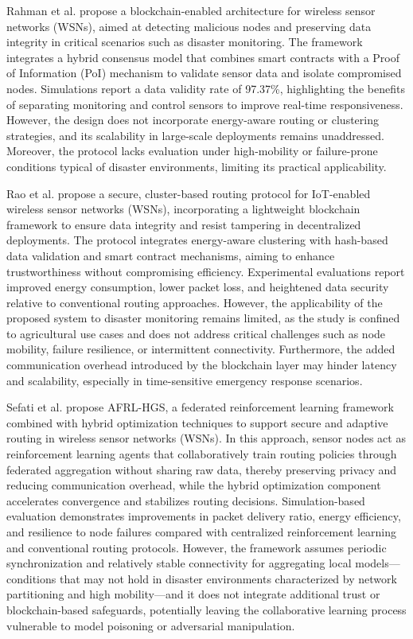 \documentclass[journal]{IEEEtran}
\begin{document}
Rahman et al. \cite{rahman_distributed_2025} propose a blockchain-enabled architecture for wireless sensor networks (WSNs), aimed at detecting malicious nodes and preserving data integrity in critical scenarios such as disaster monitoring. The framework integrates a hybrid consensus model that combines smart contracts with a Proof of Information (PoI) mechanism to validate sensor data and isolate compromised nodes. Simulations report a data validity rate of 97.37\%, highlighting the benefits of separating monitoring and control sensors to improve real-time responsiveness. However, the design does not incorporate energy-aware routing or clustering strategies, and its scalability in large-scale deployments remains unaddressed. Moreover, the protocol lacks evaluation under high-mobility or failure-prone conditions typical of disaster environments, limiting its practical applicability.

Rao et al. \cite{rao_optimized_2024} propose a secure, cluster-based routing protocol for IoT-enabled wireless sensor networks (WSNs), incorporating a lightweight blockchain framework to ensure data integrity and resist tampering in decentralized deployments. The protocol integrates energy-aware clustering with hash-based data validation and smart contract mechanisms, aiming to enhance trustworthiness without compromising efficiency. Experimental evaluations report improved energy consumption, lower packet loss, and heightened data security relative to conventional routing approaches. However, the applicability of the proposed system to disaster monitoring remains limited, as the study is confined to agricultural use cases and does not address critical challenges such as node mobility, failure resilience, or intermittent connectivity. Furthermore, the added communication overhead introduced by the blockchain layer may hinder latency and scalability, especially in time-sensitive emergency response scenarios.

Sefati et al. \cite{sefati_federated_2025} propose AFRL-HGS, a federated reinforcement learning framework combined with hybrid optimization techniques to support secure and adaptive routing in wireless sensor networks (WSNs). In this approach, sensor nodes act as reinforcement learning agents that collaboratively train routing policies through federated aggregation without sharing raw data, thereby preserving privacy and reducing communication overhead, while the hybrid optimization component accelerates convergence and stabilizes routing decisions. Simulation-based evaluation demonstrates improvements in packet delivery ratio, energy efficiency, and resilience to node failures compared with centralized reinforcement learning and conventional routing protocols. However, the framework assumes periodic synchronization and relatively stable connectivity for aggregating local models—conditions that may not hold in disaster environments characterized by network partitioning and high mobility—and it does not integrate additional trust or blockchain-based safeguards, potentially leaving the collaborative learning process vulnerable to model poisoning or adversarial manipulation.
\end{document}

